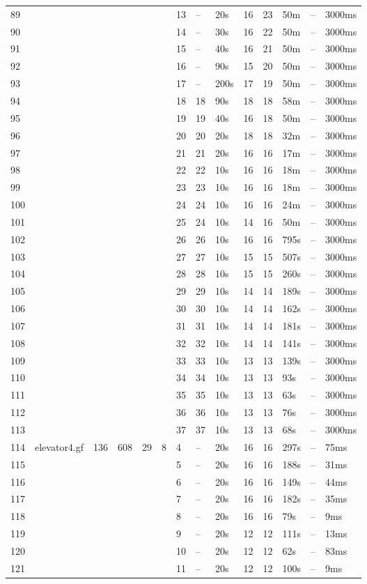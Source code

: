 \documentclass{article}
\begin{document}
\begin{longtable}{|l |l |l |l |l |l |l |l |l |l |l |l |l |l |}
89&&&&&&13&--&20s&16&23&50m&--&3000ms\\
90&&&&&&14&--&30s&16&22&50m&--&3000ms\\
91&&&&&&15&--&40s&16&21&50m&--&3000ms\\
92&&&&&&16&--&90s&15&20&50m&--&3000ms\\
93&&&&&&17&--&200s&17&19&50m&--&3000ms\\
94&&&&&&18&18&90s&18&18&58m&--&3000ms\\
95&&&&&&19&19&40s&16&18&50m&--&3000ms\\
96&&&&&&20&20&20s&18&18&32m&--&3000ms\\
97&&&&&&21&21&20s&16&16&17m&--&3000ms\\
98&&&&&&22&22&10s&16&16&18m&--&3000ms\\
99&&&&&&23&23&10s&16&16&18m&--&3000ms\\
100&&&&&&24&24&10s&16&16&24m&--&3000ms\\
101&&&&&&25&24&10s&14&16&50m&--&3000ms\\
102&&&&&&26&26&10s&16&16&795s&--&3000ms\\
103&&&&&&27&27&10s&15&15&507s&--&3000ms\\
104&&&&&&28&28&10s&15&15&260s&--&3000ms\\
105&&&&&&29&29&10s&14&14&189s&--&3000ms\\
106&&&&&&30&30&10s&14&14&162s&--&3000ms\\
107&&&&&&31&31&10s&14&14&181s&--&3000ms\\
108&&&&&&32&32&10s&14&14&141s&--&3000ms\\
109&&&&&&33&33&10s&13&13&139s&--&3000ms\\
110&&&&&&34&34&10s&13&13&93s&--&3000ms\\
111&&&&&&35&35&10s&13&13&63s&--&3000ms\\
112&&&&&&36&36&10s&13&13&76s&--&3000ms\\
113&&&&&&37&37&10s&13&13&68s&--&3000ms\\
114&elevator4.gf&136&608&29&8&4&--&20s&16&16&297s&--&75ms\\
115&&&&&&5&--&20s&16&16&188s&--&31ms\\
116&&&&&&6&--&20s&16&16&149s&--&44ms\\
117&&&&&&7&--&20s&16&16&182s&--&35ms\\
118&&&&&&8&--&20s&16&16&79s&--&9ms\\
119&&&&&&9&--&20s&12&12&111s&--&13ms\\
120&&&&&&10&--&20s&12&12&62s&--&83ms\\
121&&&&&&11&--&20s&12&12&100s&--&9ms\\

\end{longtable}
\end{document}
